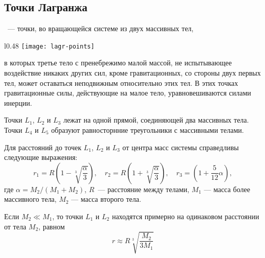 \subsection{Точки Лагранжа}

~--- точки, во вращающейся системе из двух массивных тел,
\begin{wrapfigure}[14]{l}{0.48\tw}
	\centering
	\vspace{-.5pc}
	\texttt{[image: lagr-points]}
	\label{pic:larg-points}	
\end{wrapfigure}
в которых третье тело с пренебрежимо 
малой массой, не испытывающее воздействие никаких 
других сил, кроме гравитационных, со стороны двух 
первых тел, может оставаться неподвижным относительно 
этих тел. В этих точках гравитационные силы, 
действующие на малое тело, уравновешиваются силами инерции.

Точки $L_1$, $L_2$ и $L_3$ лежат на одной прямой, 
соединяющей два массивных тела. Точки $L_4$ и $L_5$ 
образуют равносторнние треугольники с массивными 
телами.

Для расстояний до точек $L_1$, $L_2$ и $L_3$ от 
центра масс системы справедливы следующие выражения:
\begin{equation}r_1=R\left(1-\sqrt[3]{\frac{\alpha}
{3}}\right), \quad r_2=R\left(1+\sqrt[3]{\frac{\alpha}
{3}}\right), \quad r_3=\left(1+\frac{5}{12}\alpha\right),
\end{equation}
где $\alpha=M_2 / (M_1 + M_2)$, $R$~--- расстояние между 
телами, $M_1$ --- масса более массивного тела, $M_2$
 --- масса второго тела.

Если $M_2 \ll M_1$, то точки $L_1$ и $L_2$ находятся 
примерно на одинаковом расстоянии от тела $M_2$, равном
\begin{equation}
r\approx R\sqrt[3]{\frac{M_2}{3M_1}}
\end{equation}
